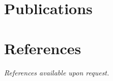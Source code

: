 \documentclass[showupdate]{xqcv}
\begin{document}
\newpage
\section{Publications}

\section{References}
\textit{References available upon request.}
\end{document}
